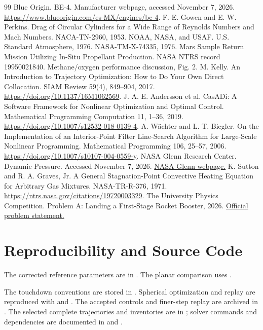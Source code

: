 \documentclass[12pt,a4paper]{article}
\begin{document}
\begin{thebibliography}{99}
 Blue Origin. BE-4. Manufacturer webpage, accessed November 7, 2026. \url{https://www.blueorigin.com/es-MX/engines/be-4}.
 F. E. Gowen and E. W. Perkins. Drag of Circular Cylinders for a Wide Range of Reynolds Numbers and Mach Numbers. NACA-TN-2960, 1953.
 NOAA, NASA, and USAF. U.S. Standard Atmosphere, 1976. NASA-TM-X-74335, 1976.
 Mars Sample Return Mission Utilizing In-Situ Propellant Production. NASA NTRS record 19950021840. Methane/oxygen performance discussion, Fig. 2.
 M. Kelly. An Introduction to Trajectory Optimization: How to Do Your Own Direct Collocation. SIAM Review 59(4), 849--904, 2017. \url{https://doi.org/10.1137/16M1062569}.
 J. A. E. Andersson et al. CasADi: A Software Framework for Nonlinear Optimization and Optimal Control. Mathematical Programming Computation 11, 1--36, 2019. \url{https://doi.org/10.1007/s12532-018-0139-4}.
 A. W\"achter and L. T. Biegler. On the Implementation of an Interior-Point Filter Line-Search Algorithm for Large-Scale Nonlinear Programming. Mathematical Programming 106, 25--57, 2006. \url{https://doi.org/10.1007/s10107-004-0559-y}.
 NASA Glenn Research Center. Dynamic Pressure. Accessed November 7, 2026. \href{https://www1.grc.nasa.gov/beginners-guide-to-aeronautics/dynamic-pressure/}{NASA Glenn webpage.}
 K. Sutton and R. A. Graves, Jr. A General Stagnation-Point Convective Heating Equation for Arbitrary Gas Mixtures. NASA-TR-R-376, 1971. \url{https://ntrs.nasa.gov/citations/19720003329}.
 The University Physics Competition. Problem A: Landing a First-Stage Rocket Booster, 2026. \href{https://university-physics-competition.com/2026-competition}{Official problem statement.}
\end{thebibliography}
\clearpage
\appendix
\section{Reproducibility and Source Code}
\begingroup\raggedright
The corrected reference parameters are in . The planar comparison uses .

The touchdown conventions are stored in . Spherical optimization and replay are reproduced with  and . The accepted controls and finer-step replay are archived in . The selected complete trajectories and inventories are in ; solver commands and dependencies are documented in  and .
\end{document}
